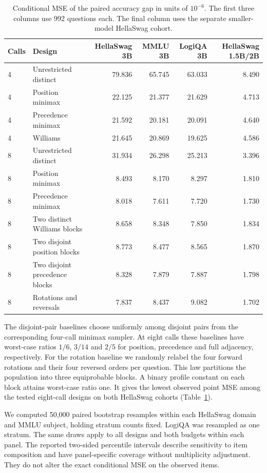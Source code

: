 \begin{table}[h]
\centering
\caption{Conditional MSE of the paired accuracy gap in units of $10^{-6}$.
The first three columns use 992 questions each. The final column uses the separate smaller-model HellaSwag cohort.}
\label{tab:eight-all}
\begin{tabular}{@{}llrrrr@{}}
\toprule
Calls & Design & HellaSwag 3B & MMLU 3B & LogiQA 3B & HellaSwag 1.5B/2B \\
\midrule
4 & Unrestricted distinct        & 79.836 & 65.745 & 63.033 & 8.490 \\
4 & Position minimax             & 22.125 & 21.377 & 21.629 & 4.713 \\
4 & Precedence minimax           & 21.592 & 20.181 & 20.091 & 4.640 \\
4 & Williams                     & 21.645 & 20.869 & 19.625 & 4.586 \\
\midrule
8 & Unrestricted distinct        & 31.934 & 26.298 & 25.213 & 3.396 \\
8 & Position minimax             & 8.493 & 8.170 & 8.297 & 1.810 \\
8 & Precedence minimax           & 8.018 & 7.611 & 7.720 & 1.730 \\
8 & Two distinct Williams blocks & 8.658 & 8.348 & 7.850 & 1.834 \\
8 & Two disjoint position blocks & 8.773 & 8.477 & 8.565 & 1.870 \\
8 & Two disjoint precedence blocks & 8.328 & 7.879 & 7.887 & 1.798 \\
8 & Rotations and reversals      & 7.837 & 8.437 & 9.082 & 1.702 \\
\bottomrule
\end{tabular}
\end{table}

The disjoint-pair baselines choose uniformly among disjoint pairs
from the corresponding four-call minimax sampler. At eight calls
these baselines have worst-case ratios $1/6$, $3/14$ and $2/5$
for position, precedence and full adjacency, respectively. For the
rotation baseline we randomly relabel the four forward rotations and
their four reversed orders \citep{khan2026} per question. This law
partitions the population into three equiprobable blocks. A binary
profile constant on each block attains worst-case ratio one. It gives
the lowest observed point MSE among the tested eight-call designs on
both HellaSwag cohorts (Table~\ref{tab:eight-all}).

We computed 50,000 paired bootstrap resamples within each HellaSwag
domain and MMLU subject, holding stratum counts fixed. LogiQA was
resampled as one stratum. The same draws apply to all designs and
both budgets within each panel. The reported two-sided percentile
intervals describe sensitivity to item composition and have
panel-specific coverage without multiplicity adjustment. They do not
alter the exact conditional MSE on the observed items.

